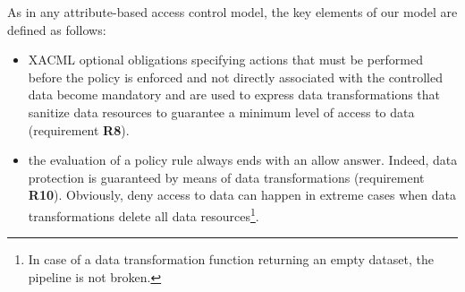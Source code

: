 As in any attribute-based access control model, the key elements of our model are defined as follows:
\begin{itemize}
\item XACML optional obligations \cite{XACML3.0} specifying actions that must be performed before the policy is enforced and not directly associated with the controlled data become mandatory and are used to express data transformations that sanitize data resources to guarantee a minimum level of access to data (requirement {\bf R8}). 
\item the evaluation of a policy rule always ends with an allow answer. Indeed, data protection is guaranteed by means of data transformations (requirement {\bf R10}). Obviously, deny access to data can happen in extreme cases when data transformations delete all data resources\footnote{In case of a data transformation function returning an empty dataset, the pipeline is not broken.}. 
\end{itemize}

